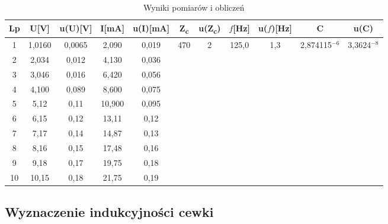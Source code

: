 \documentclass[12pt]{article}
\begin{document}
\begin{table}[h]
    \centering
    \caption{Wyniki pomiarów i obliczeń}
    \label{tab:tabela1}
    \begin{tabular}{|c|c|c|c|c|c|c|c|c|c|c|} \hline
    Lp & U[V] & u(U)[V] & I[mA] & u(I)[mA] & Z\textsubscript{c} & u(Z\textsubscript{c}) & $f$[Hz] & u($f$)[Hz] & C & u(C) \\ \hline
    1 & 1,0160 & 0,0065 & 2,090 & 0,019 & \multirow{10}{*}{470} & \multirow{10}{*}{2} & \multirow{10}{*}{125,0} & \multirow{10}{*}{1,3} & \multirow{10}{*}{2,874115$^{-6}$} & \multirow{10}{*}{3,3624$^{-8}$} \\ \cline{1-5}
    2 & 2,034 & 0,012 & 4,130 & 0,036 & & & & & & \\ \cline{1-5}
    3 & 3,046 & 0,016 & 6,420 & 0,056 & & & & & & \\ \cline{1-5}
    4 & 4,100 & 0,089 & 8,600 & 0,075 & & & & & & \\ \cline{1-5}
    5 & 5,12 & 0,11 & 10,900 & 0,095 & & & & & & \\ \cline{1-5}
    6 & 6,15 & 0,12 & 13,11 & 0,12 & & & & & & \\ \cline{1-5}
    7 & 7,17 & 0,14 & 14,87 & 0,13 & & & & & & \\ \cline{1-5}
    8 & 8,16 & 0,15 & 17,48 & 0,16 & & & & & & \\ \cline{1-5}
    9 & 9,18 & 0,17 & 19,75 & 0,18 & & & & & & \\ \cline{1-5}
    10 & 10,15 & 0,18 & 21,75 & 0,19 & & & & & & \\ \hline
    \end{tabular}
\end{table}

\subsection{Wyznaczenie indukcyjności cewki}
    
\end{document}
